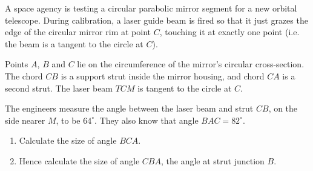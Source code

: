 \begin{question}
\noindent A space agency is testing a circular parabolic mirror segment for a new orbital telescope. During calibration, a laser guide beam is fired so that it just grazes the edge of the circular mirror rim at point $C$, touching it at exactly one point (i.e. the beam is a tangent to the circle at $C$).

Points $A$, $B$ and $C$ lie on the circumference of the mirror's circular cross-section. The chord $CB$ is a support strut inside the mirror housing, and chord $CA$ is a second strut. The laser beam $TCM$ is tangent to the circle at $C$.

The engineers measure the angle between the laser beam and strut $CB$, on the side nearer $M$, to be $64^\circ$. They also know that angle $BAC = 82^\circ$.

\begin{center}
\end{center}

\begin{enumerate}
    \item[(a)] Calculate the size of angle $BCA$.
    \vspace{3.5cm}

    \item[(b)] Hence calculate the size of angle $CBA$, the angle at strut junction $B$.
    \vspace{3.5cm}
\end{enumerate}
\end{question}
